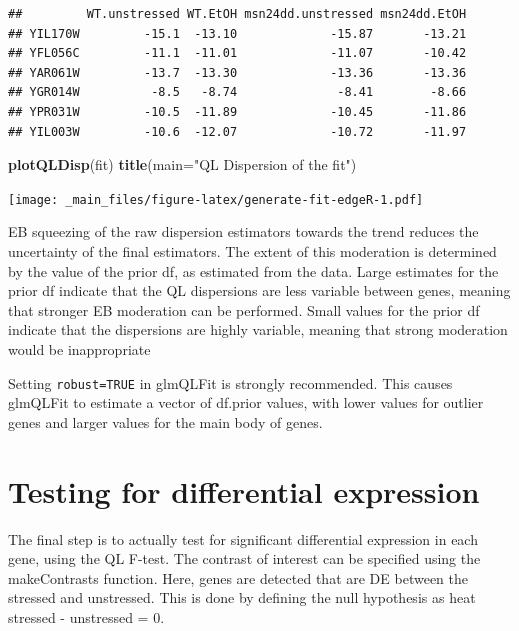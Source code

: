 \documentclass[
]{book}
\newenvironment{Shaded}{\begin{snugshade}}{\end{snugshade}}
\newcommand{\AttributeTok}[1]{\textcolor[rgb]{0.13,0.29,0.53}{#1}}
\newcommand{\FunctionTok}[1]{\textcolor[rgb]{0.13,0.29,0.53}{\textbf{#1}}}
\newcommand{\NormalTok}[1]{#1}
\newcommand{\StringTok}[1]{\textcolor[rgb]{0.31,0.60,0.02}{#1}}
\begin{document}
\begin{verbatim}
##         WT.unstressed WT.EtOH msn24dd.unstressed msn24dd.EtOH
## YIL170W         -15.1  -13.10             -15.87       -13.21
## YFL056C         -11.1  -11.01             -11.07       -10.42
## YAR061W         -13.7  -13.30             -13.36       -13.36
## YGR014W          -8.5   -8.74              -8.41        -8.66
## YPR031W         -10.5  -11.89             -10.45       -11.86
## YIL003W         -10.6  -12.07             -10.72       -11.97
\end{verbatim}

\begin{Shaded}
\begin{Highlighting}[]
\FunctionTok{plotQLDisp}\NormalTok{(fit)}
\FunctionTok{title}\NormalTok{(}\AttributeTok{main=}\StringTok{"QL Dispersion of the fit"}\NormalTok{)}
\end{Highlighting}
\end{Shaded}

\texttt{[image: \_main\_files/figure-latex/generate-fit-edgeR-1.pdf]}

EB squeezing of the raw dispersion estimators towards the trend reduces
the uncertainty of the final estimators. The extent of this moderation
is determined by the value of the prior df, as estimated from the data.
Large estimates for the prior df indicate that the QL dispersions are
less variable between genes, meaning that stronger EB moderation can be
performed. Small values for the prior df indicate that the dispersions
are highly variable, meaning that strong moderation would be
inappropriate

Setting \texttt{robust=TRUE} in glmQLFit is strongly recommended. This causes
glmQLFit to estimate a vector of df.prior values, with lower values for
outlier genes and larger values for the main body of genes.

\hypertarget{testing-for-differential-expression}{%
\section{Testing for differential expression}\label{testing-for-differential-expression}}

The final step is to actually test for significant differential
expression in each gene, using the QL F-test. The contrast of interest
can be specified using the makeContrasts function. Here, genes are
detected that are DE between the stressed and unstressed. This is done
by defining the null hypothesis as heat stressed - unstressed = 0.
\end{document}
